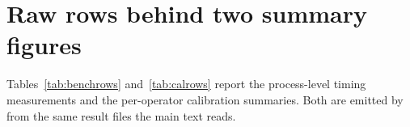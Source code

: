 \documentclass[11pt]{article}
\begin{document}
\section{Raw rows behind two summary figures}

Tables~\ref{tab:benchrows} and~\ref{tab:calrows} report the process-level timing measurements and the
per-operator calibration summaries. Both are emitted by
 from the same result files the main text reads.

\begin{table}[htbp]
\centering
\caption{The benchmark of Section~\SecOverhead{} as nine independent processes. The
coefficient of variation is the sample standard deviation over the mean, in
percent, with Bessel's correction. The absolute columns move with machine state;
the last row gives each column's coefficient of variation.}
\label{tab:benchrows}

\end{table}

\begin{table}[htbp]
\centering
\caption{Calibration probes per operator, with the context and source position
that produced the widest measured influence. The full per-probe record, all
\Kprobes{} rows, is in \texttt{results/machine\_readable/CALIBRATION.json};
this table gives the worst case for each operator,
which is the value the declaration has to cover. The \Kops{} rows are the
single-source configurations: concatenation assembles the corpus rather than
transforming it, and overlay takes several sources at once.}
\label{tab:calrows}

\end{table}
\end{document}
